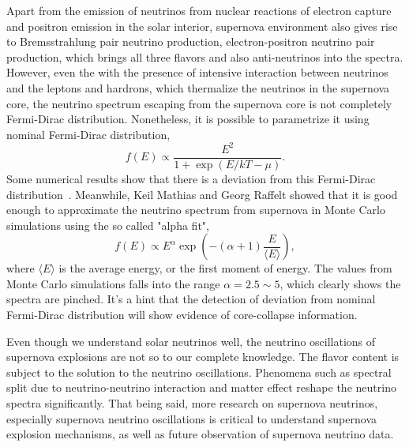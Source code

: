Apart from the emission of neutrinos from nuclear reactions of electron capture and positron emission in the solar interior, supernova environment also gives rise to Bremsstrahlung pair neutrino production, electron-positron neutrino pair production, which brings all three flavors and also anti-neutrinos into the spectra. However, even the with the presence of intensive interaction between neutrinos and the leptons and hardrons, which thermalize the neutrinos in the supernova core, the neutrino spectrum escaping from the supernova core is not completely Fermi-Dirac distribution. Nonetheless, it is possible to parametrize it using nominal Fermi-Dirac distribution,\cite{ysuzuki2004}
\begin{equation}
f(E)\propto \frac{E^2}{1+\exp ( E/kT - \mu )}.
\end{equation}
Some numerical results show that there is a deviation from this Fermi-Dirac distribution~\cite{Totani1998,Keil2003}. Meanwhile, Keil Mathias and Georg Raffelt showed that it is good enough to approximate the neutrino spectrum from supernova in Monte Carlo simulations using the so called "alpha fit",
\begin{equation}
f(E)\propto E^\alpha \exp\left( -(\alpha+1)\frac{E}{\langle E\rangle} \right),
\end{equation}
where $\langle E\rangle$ is the average energy, or the first moment of energy. The values from Monte Carlo simulations falls into the range $\alpha = 2.5\sim 5$,
which clearly shows the spectra are pinched. It's a hint that the detection of deviation from nominal Fermi-Dirac distribution will show evidence of core-collapse information.




Even though we understand solar neutrinos well, the neutrino oscillations of supernova explosions are not so to our complete knowledge. The flavor content is subject to the solution to the neutrino oscillations. Phenomena such as spectral split due to neutrino-neutrino interaction and matter effect reshape the neutrino spectra significantly. That being said, more research on supernova neutrinos, especially supernova neutrino oscillations is critical to understand supernova explosion mechanisms, as well as future observation of supernova neutrino data.


